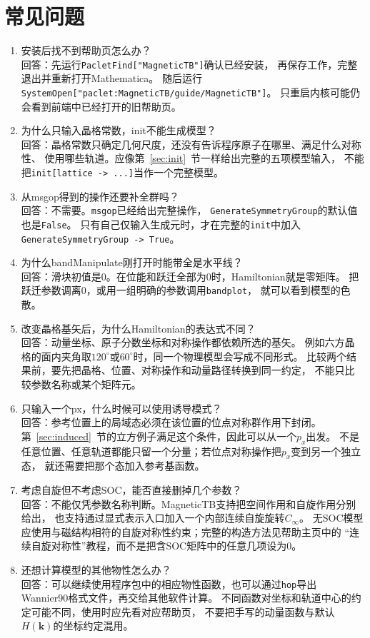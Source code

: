 \documentclass[titlepage,a4paper,12pt,AutoFakeBold]{article}
\newcommand\litem[1]{\item{ #1？\\}}
\begin{document}
\section{常见问题}
\begin{enumerate}[style=nextline]
\setlength\itemsep{1.2em}
\litem{安装后找不到帮助页怎么办}
回答：先运行\lstinline|PacletFind["MagneticTB"]|确认已经安装，
再保存工作，完整退出并重新打开Mathematica。
随后运行\lstinline|SystemOpen["paclet:MagneticTB/guide/MagneticTB"]|。
只重启内核可能仍会看到前端中已经打开的旧帮助页。

\litem{为什么只输入晶格常数，init不能生成模型}
回答：晶格常数只确定几何尺度，还没有告诉程序原子在哪里、满足什么对称性、
使用哪些轨道。应像第~\ref{sec:init}~节一样给出完整的五项模型输入，
不能把\lstinline|init[lattice -> ...]|当作一个完整模型。

\litem{从msgop得到的操作还要补全群吗}
回答：不需要。\lstinline|msgop|已经给出完整操作，
\lstinline|GenerateSymmetryGroup|的默认值也是\lstinline|False|。
只有自己仅输入生成元时，才在完整的\lstinline|init|中加入
\lstinline|GenerateSymmetryGroup -> True|。

\litem{为什么bandManipulate刚打开时能带全是水平线}
回答：滑块初值是0。在位能和跃迁全部为0时，Hamiltonian就是零矩阵。
把跃迁参数调离0，或用一组明确的参数调用\lstinline|bandplot|，
就可以看到模型的色散。

\litem{改变晶格基矢后，为什么Hamiltonian的表达式不同}
回答：动量坐标、原子分数坐标和对称操作都依赖所选的基矢。
例如六方晶格的面内夹角取$120^\circ$或$60^\circ$时，同一个物理模型会写成不同形式。
比较两个结果前，要先把晶格、位置、对称操作和动量路径转换到同一约定，
不能只比较参数名称或某个矩阵元。

\litem{只输入一个px，什么时候可以使用诱导模式}
回答：参考位置上的局域态必须在该位置的位点对称群作用下封闭。
第~\ref{sec:induced}~节的立方例子满足这个条件，因此可以从一个$p_x$出发。
不是任意位置、任意轨道都能只留一个分量；若位点对称操作把$p_x$变到另一个独立态，
就还需要把那个态加入参考基函数。

\litem{考虑自旋但不考虑SOC，能否直接删掉几个参数}
回答：不能仅凭参数名称判断。\textsf{MagneticTB}支持把空间作用和自旋作用分别给出，
也支持通过显式表示入口加入一个内部连续自旋旋转$C_\infty$。
无SOC模型应使用与磁结构相符的自旋对称性约束；完整的构造方法见帮助主页中的
“连续自旋对称性”教程，而不是把含SOC矩阵中的任意几项设为0。

\litem{还想计算模型的其他物性怎么办}
回答：可以继续使用程序包中的相应物性函数，也可以通过\lstinline|hop|导出
Wannier90格式文件，再交给其他软件计算。
不同函数对坐标和轨道中心的约定可能不同，使用时应先看对应帮助页，
不要把手写的动量函数与默认$H(\boldsymbol k)$的坐标约定混用。


\end{enumerate}
\end{document}
